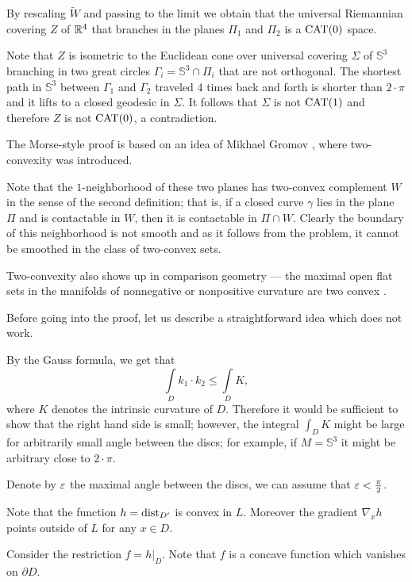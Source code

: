 By rescaling $\tilde W$ and passing to the limit we obtain that the universal Riemannian covering $Z$ of $\mathbb{R}^4$ that branches in the planes $\Pi_1$ and $\Pi_2$ is a $\operatorname{\rm CAT}\nolimits(0)$ space.

Note that $Z$ is isometric to the Euclidean cone over universal covering $\Sigma$ of $\mathbb{S}^3$ branching in two great circles $\Gamma_i=\mathbb{S}^3\cap \Pi_i$ that are not orthogonal.
The shortest path in $\mathbb{S}^3$ between $\Gamma_1$ and $\Gamma_2$ traveled 4 times back and forth is shorter than $2\cdot\pi$ and it lifts to a closed geodesic in $\Sigma$.
It follows that $\Sigma$ is not $\operatorname{\rm CAT}\nolimits(1)$ and therefore $Z$ is not $\operatorname{\rm CAT}\nolimits(0)$, a contradiction.\qeds

The Morse-style proof is based on an idea of Mikhael Gromov \cite[see \S\textonehalf{} in][]{gromov-SGMC}, where two-convexity was introduced.

Note that the $1$-neighborhood of these two planes has two-convex complement $W$ in the sense of the second definition;
that is, if a closed curve $\gamma$ lies in the plane $\Pi$
and is contactable in $W$, then it is contactable in $\Pi\cap W$.
Clearly the boundary of this neighborhood is not smooth
and as it follows from the problem, it cannot be smoothed in the class of two-convex sets. 

Two-convexity also shows up in comparison geometry --- the maximal open flat sets in the manifolds of nonnegative or nonpositive curvature are two convex \cite{panov-petrunin}.


Before going into the proof, let us describe a straightforward idea which does not work.

By the Gauss formula, we get that 
\[\int\limits_{D}k_1\cdot k_2\le\int\limits_{D}K,\] 
where $K$ denotes the intrinsic curvature of $D$.
Therefore it would be sufficient to show that the right hand side is small;
however, the integral $\int_{D}K$ might be large for arbitrarily small angle between the discs; for example, if $M=\mathbb{S}^3$ it might be arbitrary close to $2\cdot \pi$.

\medskip

Denote by $\varepsilon$ the maximal angle between the discs, we can assume that $\varepsilon<\tfrac\pi2$.

Note that the function $h=\operatorname{\rm dist}\nolimits_{D'}$ is convex in $L$.
Moreover the gradient $\nabla_xh$ points outside of $L$ for any $x\in D$. 

Consider the restriction $f=h|_D$.
Note that $f$ is a concave function which vanishes on $\partial D$.


